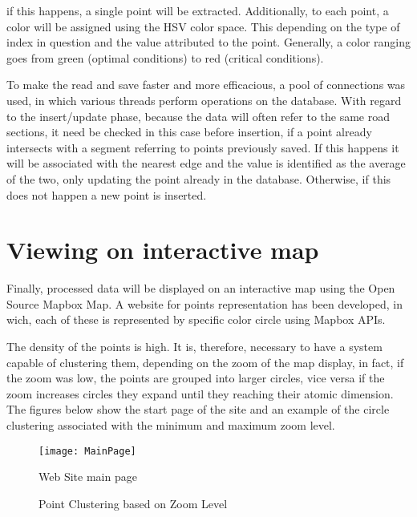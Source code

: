 \documentclass[tesi]{subfiles}
\begin{document}
if this happens, a single point will be extracted.
Additionally, to each point, a color will be assigned using the HSV color space. This depending on the type of index in question and the value attributed to the point. Generally, a color ranging goes from green (optimal conditions) to red (critical conditions).

To make the read and save faster and more efficacious, a pool of connections was used, in which various threads perform operations on the database. With regard to the insert/update phase, because the data will often refer to the same road sections, it need be checked in this case before insertion, if a point already intersects with a segment referring to points previously saved. If this happens it will be associated with the nearest edge and the value is identified as the average of the two, only updating the point already in the database. Otherwise, if this does not happen a new point is inserted.


\clearpage
\section{Viewing on interactive map}\label{sc:Viewing on interactive map}
Finally, processed data will be displayed on an interactive map using the Open Source Mapbox Map. A website for points representation has been developed, in wich, each of these is represented by specific color circle using Mapbox APIs.

The density of the points is high. It is, therefore, necessary to have a system capable of clustering them, depending on the zoom of the map display, in fact, if the zoom was low, the points are grouped into larger circles, vice versa if the zoom increases circles they expand until they reaching their atomic dimension.
The figures below show the start page of the site and an example of the circle clustering associated with the minimum and maximum zoom level.

\begin{figure}[H]
\centering
\texttt{[image: MainPage]}
\caption{Web Site main page}
\end{figure}\label{fig:WebSite Main Page}

\begin{figure}[H]
  \centering

  \hspace{10mm}
  \caption{Point Clustering based on Zoom Level}
  \label{fig:Point Clustering based on Zoom Level}
\end{figure}
\clearpage
\end{document}
